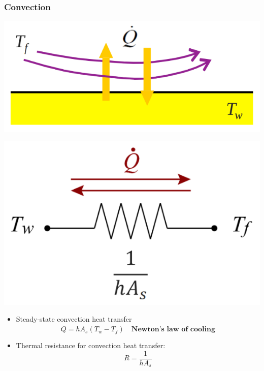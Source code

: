 \documentclass[11pt]{article}
\begin{document}
\subsubsection{Convection}
\label{sec:orge8e0f09}
\begin{center}
\includegraphics[scale=1]{./images/thermal-resistance-convection.png}
\end{center}
\begin{center}
\includegraphics[scale=1]{./images/thermal-resistance-convection-electrical-analogy.png}
\end{center}
\begin{itemize}
\item Steady-state convection heat transfer
\[\dot{Q} = h A_s (T_w - T_f) \quad \textbf{Newton's law of cooling}\]
\item Thermal resistance for convection heat transfer:
\[R = \frac{1}{h A_s}\]
\end{itemize}

 \newpage
\end{document}
